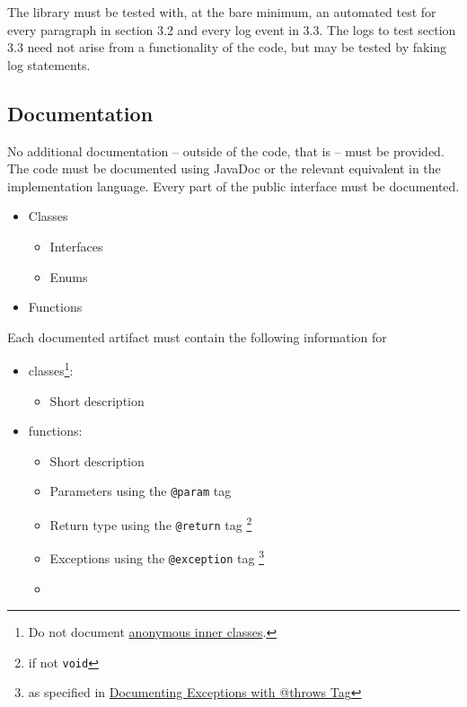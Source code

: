 \documentclass[11pt]{article} %
\begin{document}
    The library must be tested with, at the bare minimum, an automated test for every paragraph in section 3.2 and every log event in 3.3. The logs to test section 3.3 need not arise from a functionality of the code, but may be tested by faking log statements.


    \subsection{Documentation}\label{sec:3.6}

    No additional documentation -- outside of the code, that is -- must be provided. The code must be documented using JavaDoc or the relevant equivalent in the implementation language. Every part of the public interface must be documented.

    \begin{itemize}
        \item Classes
        \begin{itemize}
            \item Interfaces
            \item Enums
        \end{itemize}
        \item Functions
    \end{itemize}

    Each documented artifact must contain the following information for

    \begin{itemize}
        \item[] classes\footnote{Do not document \href{https://www.oracle.com/technical-resources/articles/java/javadoc-tool.html#anonymous}{anonymous inner classes}.}:
        \begin{itemize}
            \item Short description
        \end{itemize}
        \item[] functions:
        \begin{itemize}
            \item Short description
            \item Parameters using the \verb|@param| tag
            \item Return type using the \verb|@return| tag \footnote{if not \verb|void|}
            \item Exceptions using the \verb|@exception| tag \footnote{as specified in \href{https://www.oracle.com/technical-resources/articles/java/javadoc-tool.html#throwstag}{Documenting Exceptions with @throws Tag}}
            \item
        \end{itemize}
    \end{itemize}
\end{document}
